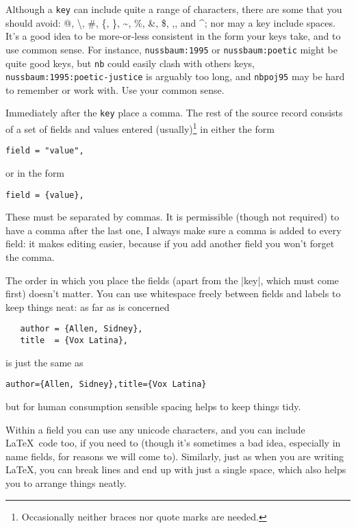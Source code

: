 {\newcommand{\romcom}{{\normalfont , }} 

Although a \verb|key| can include quite a range of characters, there
are some that you should avoid: {\ttfamily \textquotedbl\romcom
    @\romcom \textquotesingle\romcom \textbackslash\romcom \#\romcom
    \{\romcom \}\romcom \textasciitilde\romcom \%\romcom
    \textunderscore\romcom \&\romcom \$\romcom ,\romcom {\normalfont
      and }\^{}}; nor may a key include spaces. It's a good idea to be
more-or-less consistent in the form your keys take, and to use
common sense. For instance, \texttt{nussbaum:1995} or
\texttt{nussbaum:poetic} might be quite good keys, but \texttt{nb}
could easily clash with others keys,
\texttt{nussbaum:1995:poetic-justice} is arguably too long, and
\texttt{nbpoj95} may be hard to remember or work with. Use your
common sense.

Immediately after the \verb|key| place a comma. The rest of the
source record consists of a set of fields and values entered
(usually)\footnote{Occasionally neither braces nor quote marks are
    needed.} in either the form
\begin{center}\texttt{field = "value",}\end{center}
or in the form
\begin{center}\texttt{field = \{value\},}\end{center}
These must be separated by commas. It is permissible (though not
required) to have a comma after the last one, I always make sure a
comma is added to every field: it makes editing easier, because if you
add another field you won't forget the comma.

The order in which you place the fields (apart from the |key|, which
must come first) doesn't matter. You can use whitespace freely between
fields and labels to keep things neat: as far as  is
concerned
\begin{Verbatim}
   author = {Allen, Sidney},
   title  = {Vox Latina},
\end{Verbatim}
is just the same as
\begin{Verbatim}
author={Allen, Sidney},title={Vox Latina}
\end{Verbatim}
but for human consumption sensible spacing helps to keep things tidy.

Within a field you can use any unicode characters, and you can include
\LaTeX\ code too, if you need to (though it's sometimes a bad idea,
especially in name fields, for reasons we will come to). Similarly,
just as when you are writing \LaTeX, you can break lines and end up
with just a single space, which also helps you to arrange things
neatly.

}
